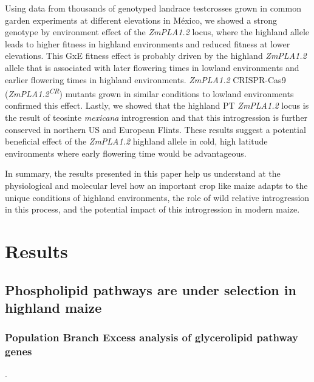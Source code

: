 \documentclass[9pt,twocolumn,twoside,lineno]{BioRxiv}
\begin{document}
Using data from thousands of genotyped landrace testcrosses grown in common garden experiments at different elevations in México, we showed a strong genotype by environment effect of the \textit{ZmPLA1.2} locus, 
where the highland allele leads to higher fitness in highland environments and reduced fitness at lower elevations. 
This GxE fitness effect is probably driven by the highland \textit{ZmPLA1.2} allele that is associated with later flowering times in lowland environments and earlier flowering times in highland environments. 
\textit{ZmPLA1.2} CRISPR-Cas9 (\textit{ZmPLA1.2\textsuperscript{CR}}) mutants grown in similar conditions to lowland environments confirmed this effect.
Lastly, we showed that the highland PT \textit{ZmPLA1.2} locus is the result of teosinte \textit{mexicana} introgression and that this introgression is further conserved in northern US and European Flints. 
These results suggest a potential beneficial effect of the \textit{ZmPLA1.2} highland allele in cold, high latitude environments where early flowering time would be advantageous.

In summary, the results presented in this paper help us understand at the physiological and molecular level how an important crop like maize adapts to the unique conditions of highland environments, the role of wild relative introgression in this process, and the potential impact of this introgression in modern maize.

\section{Results}
\label{sec:results}

\subsection{Phospholipid pathways are under selection in  highland maize} 
\subsubsection{Population Branch Excess analysis of glycerolipid pathway genes}. 
\end{document}

